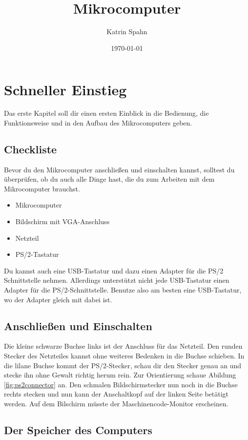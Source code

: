 \documentclass[10pt]{book}
\title{Mikrocomputer}
\author{Katrin Spahn}
\date{\today}
\begin{document}
\maketitle

\tableofcontents

\chapter{Schneller Einstieg}

Das erste Kapitel soll dir einen ersten Einblick
in die Bedienung, die Funktionsweise
und in den Aufbau des Mikrocomputers geben.

\section{Checkliste}
Bevor du den Mikrocomputer anschließen und einschalten
kannst, solltest du überprüfen, ob du auch alle Dinge
hast, die du zum Arbeiten mit dem Mikrocomputer brauchst.

\begin{itemize}
\item Mikrocomputer
\item Bildschirm mit VGA-Anschluss
\item Netzteil
\item PS/2-Tastatur 

\end{itemize}
Du kannst auch eine USB-Tastatur
und dazu einen Adapter für die
PS/2 Schnittstelle nehmen.
Allerdings unterstützt nicht jede USB-Tastatur
einen Adapter für die PS/2-Schnittstelle.
Benutze also am besten eine USB-Tastatur,
wo der Adapter gleich mit dabei ist.


\section{Anschließen und Einschalten}

Die kleine schwarze Buchse links
ist der Anschluss für das Netzteil.
Den runden Stecker des Netzteiles kannst
ohne weiteres Bedenken in die Buchse schieben.
In die lilane Buchse kommt der PS/2-Stecker,
schau dir den Stecker genau an und stecke ihn
ohne Gewalt richtig herum rein.
Zur Orientierung schaue
Abildung \ref{fig:ps2connector} an.
Den schmalen Bildschirmstecker nun noch
in die Buchse rechts stecken
und nun kann der Anschaltkopf
auf der linken Seite betätigt werden.
Auf dem Bilschirm müsste der
Maschinencode-Monitor erscheinen.

\section{Der Speicher des Computers}
\end{document}
